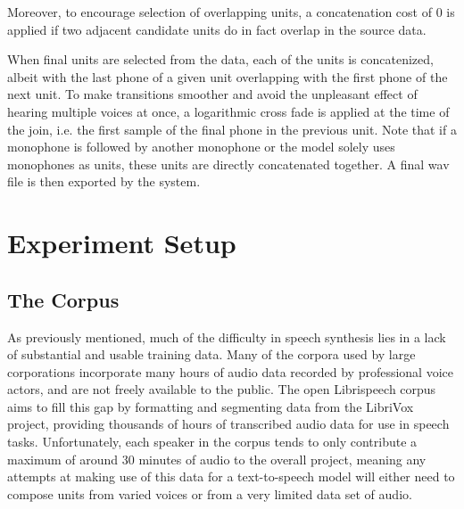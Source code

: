 \documentclass[10pt, journal, compsoc]{IEEEtran}
\begin{document}
Moreover, to encourage selection of overlapping units, a concatenation cost of 0 is applied if two adjacent candidate units do in fact overlap in the source data.\par
When final units are selected from the data, each of the units is concatenized, albeit with the last phone of a given unit overlapping with the first phone of the next unit. To make transitions smoother and avoid the unpleasant effect of hearing multiple voices at once, a logarithmic cross fade is applied at the time of the join, i.e. the first sample of the final phone in the previous unit. Note that if a monophone is followed by another monophone or the model solely uses monophones as units, these units are directly concatenated together. A final wav file is then exported by the system.
\section{Experiment Setup}
\subsection{The Corpus}
As previously mentioned, much of the difficulty in speech synthesis lies in a lack of substantial and usable training data. Many of the corpora used by large corporations incorporate many hours of audio data recorded by professional voice actors, and are not freely available to the public. The open Librispeech corpus\cite{unknown} aims to fill this gap by formatting and segmenting data from the LibriVox project, providing thousands of hours of transcribed audio data for use in speech tasks. Unfortunately, each speaker in the corpus tends to only contribute a maximum of around 30 minutes of audio to the overall project, meaning any attempts at making use of this data for a text-to-speech model will either need to compose units from varied voices or from a very limited data set of audio.\par
\end{document}
